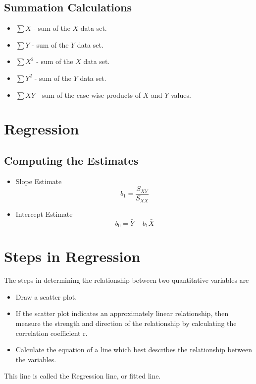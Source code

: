 \documentclass[]{report}
\begin{document}
\subsection{Summation Calculations}
\begin{framed}
\begin{itemize}
	\item $\sum X$ - sum of the $X$ data set.
	\item $\sum Y$ - sum of the $Y$ data set.
	\item $\sum X^2$ - sum of the $X$ data set.
	\item $\sum Y^2$ - sum of the $Y$ data set.
	\item $\sum XY$ - sum of the case-wise products  of $X$ and $Y$ values.
\end{itemize}
\end{framed}


\section{Regression}


\subsection{Computing the Estimates}
\begin{itemize}
	\item Slope Estimate
	\[b_1 = \frac{S_{XY}}{S_{XX}} \]
	\item Intercept Estimate
	\[b_0 = \bar{Y} - b_1\bar{X} \]
\end{itemize}


	
\section{Steps in Regression}
The steps in determining the relationship between two
quantitative variables are
\begin{itemize} \item Draw a scatter plot.
	\item If the scatter plot indicates an approximately linear
	relationship, then measure the strength and direction of the
	relationship by calculating the correlation coefficient r.
	\item Calculate the equation of a line which best describes the
	relationship between the variables.
\end{itemize}
This line is called the Regression line, or fitted line.
\end{document}
